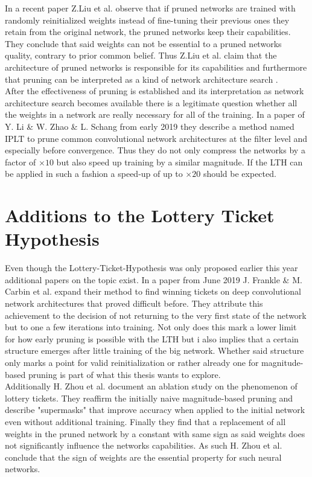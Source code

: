 In a recent paper \cite{Rethinking-Network-Pruning} Z.Liu et al. observe that if pruned networks are trained with randomly reinitialized weights instead of fine-tuning their previous ones they retain from the original network, the pruned networks keep their capabilities. They conclude that said weights can not be essential to a pruned networks quality, contrary to prior common belief. Thus Z.Liu et al. claim that the architecture of pruned networks is responsible for its capabilities and furthermore that pruning can be interpreted as a kind of network architecture search .\\
After the effectiveness of pruning is established and its interpretation as network architecture search becomes available there is a legitimate question whether all the weights in a network are really necessary for all of the training. In a paper of Y. Li \& W. Zhao \& L. Schang from early 2019 \cite{Pruning-With-Little-Training} they describe a method named IPLT to prune common convolutional network architectures at the filter level and especially before convergence. Thus they do not only compress the networks by a factor of $\times10$ but also speed up training by a similar magnitude. If the LTH can be applied in such a fashion a speed-up of up to $\times20$ should be expected.

\section{Additions to the Lottery Ticket Hypothesis}
Even though the Lottery-Ticket-Hypothesis was only proposed earlier this year additional papers on the topic exist.
In a paper from June 2019 J. Frankle \& M. Carbin et al. \cite{LTH-At-Scale} expand their method to find winning tickets on deep convolutional network architectures that proved difficult before. They attribute this achievement to the decision of not returning to the very first state of the network but to one a few iterations into training. Not only does this mark a lower limit for how early pruning is possible with the LTH but i also implies that a certain structure emerges after little training of the big network. Whether said structure only marks a point for valid reinitialization or rather already one for magnitude-based pruning is part of what this thesis wants to explore.\\
Additionally H. Zhou et al. \cite{Deconstructing_LTH} document an ablation study on the phenomenon of lottery tickets. They reaffirm the initially naive magnitude-based pruning and describe "supermasks" that improve accuracy when applied to the initial network even without additional training. Finally they find that a replacement of all weights in the pruned network by a constant with same sign as said weights does not significantly influence the networks capabilities. As such H. Zhou et al. conclude that the sign of weights are the essential property for such neural networks. 
